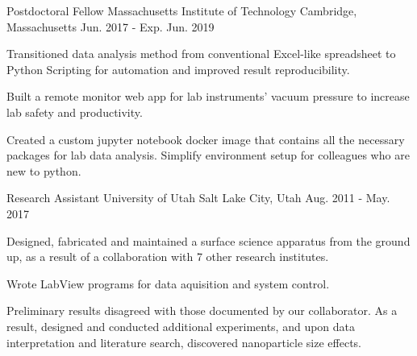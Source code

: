 


\begin{cventries}


\cventry
{Postdoctoral Fellow}
{Massachusetts Institute of Technology}
{Cambridge, Massachusetts}
{Jun. 2017 - Exp. Jun. 2019}
{
\begin{cvitems}
\item {Transitioned data analysis method from conventional Excel-like
    spreadsheet to Python Scripting for automation and improved result
    reproducibility.}
\item {Built a remote monitor web app for lab instruments' vacuum pressure to
    increase lab safety and productivity.}
\item {Created a custom jupyter notebook docker image that contains all the
    necessary packages for lab data analysis. Simplify environment setup for
    colleagues who are new to python.}
\end{cvitems}
}


\cventry
{Research Assistant}
{University of Utah}
{Salt Lake City, Utah}
{Aug. 2011 - May. 2017}
{
\begin{cvitems}
\item {Designed, fabricated and maintained a surface science apparatus from the
    ground up, as a result of a collaboration with 7 other research institutes.}
\item {Wrote LabView programs for data aquisition and system control.}
\item {Preliminary results disagreed with those documented by our collaborator.
    As a result, designed and conducted additional experiments, and
    upon data interpretation and literature search, discovered nanoparticle size
    effects.}
\end{cvitems}
}


\end{cventries}